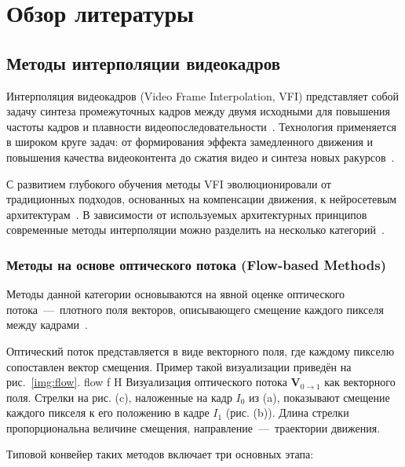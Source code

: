 \chapter{Обзор литературы}

\section{Методы интерполяции видеокадров}

Интерполяция видеокадров (Video Frame Interpolation, VFI) представляет собой задачу синтеза промежуточных кадров между двумя исходными для повышения частоты кадров и плавности видеопоследовательности~\cite{kye2026acevfi}. Технология применяется в широком круге задач: от формирования эффекта замедленного движения и повышения качества видеоконтента до сжатия видео и синтеза новых ракурсов~\cite{huang2022}.

С развитием глубокого обучения методы VFI эволюционировали от традиционных подходов, основанных на компенсации движения, к нейросетевым архитектурам~\cite{kye2026acevfi}. В зависимости от используемых архитектурных принципов современные методы интерполяции можно разделить на несколько категорий~\cite{kye2026acevfi}.

\subsection*{Методы на основе оптического потока (Flow-based Methods)}

Методы данной категории основываются на явной оценке оптического потока~---~плотного поля векторов, описывающего смещение каждого пикселя между кадрами~\cite{IFRNet2022}.

Оптический поток представляется в виде векторного поля, где каждому пикселю сопоставлен вектор смещения. Пример такой визуализации приведён на рис.~\ref{img:flow}.
	{flow}
	{f}
	{H}
	{\textwidth}
	{Визуализация оптического потока $\mathbf{V}_{0\to1}$ как векторного поля.
		Стрелки на рис. (c), наложенные на кадр $I_0$ из (a), показывают смещение каждого пикселя к его положению в кадре $I_1$ (рис. (b)).
		Длина стрелки пропорциональна величине смещения, направление~---~траектории движения.}

Типовой конвейер таких методов включает три основных этапа:

